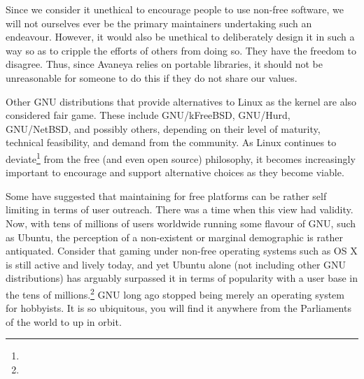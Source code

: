 Since we consider it unethical to encourage people to use non-free software, we will not ourselves ever be the primary maintainers undertaking such an endeavour. However, it would also be unethical to deliberately design it in such a way so as to cripple the efforts of others from doing so. They have the freedom to disagree. Thus, since Avaneya relies on portable libraries, it should not be unreasonable for someone to do this if they do not share our values.

Other GNU distributions that provide alternatives to Linux as the kernel are also considered fair game. These include GNU/kFreeBSD, GNU/Hurd, GNU/NetBSD, and possibly others, depending on their level of maturity, technical feasibility, and demand from the community. As Linux continues to deviate\footnote{} from the free (and even open source) philosophy, it becomes increasingly important to encourage and support alternative choices as they become viable.

Some have suggested that maintaining for free platforms can be rather self limiting in terms of user outreach. There was a time when this view had validity. Now, with tens of millions of users worldwide running some flavour of GNU, such as Ubuntu, the perception of a non-existent or marginal demographic  is rather antiquated. Consider that gaming under non-free operating systems such as OS X is still active and lively today, and yet Ubuntu alone (not including other GNU distributions) has arguably surpassed it in terms of popularity with a user base in the tens of millions.\footnote{} GNU long ago stopped being merely an operating system for hobbyists. It is so ubiquitous, you will find it anywhere from the Parliaments of the world to up in orbit.

\StopChapter

